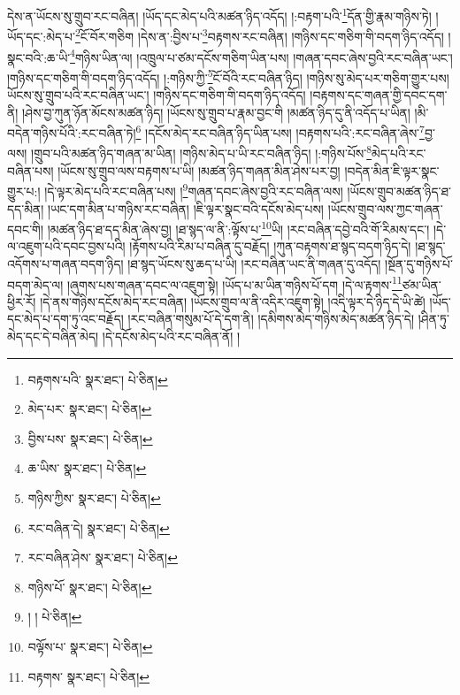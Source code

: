 དེས་ན་ཡོངས་སུ་གྲུབ་རང་བཞིན། །ཡོད་དང་མེད་པའི་མཚན་ཉིད་འདོད། །:བརྟག་པའི་\footnote{བརྟགས་པའི་  སྣར་ཐང་།  པེ་ཅིན། }དོན་གྱི་རྣམ་གཉིས་ཏེ། །ཡོད་དང་:མེད་པ་\footnote{མེད་པར་  སྣར་ཐང་།  པེ་ཅིན། }ངོ་བོར་གཅིག །དེས་ན་:བྱིས་པ་\footnote{བྱིས་པས་  སྣར་ཐང་།  པེ་ཅིན། }བརྟགས་རང་བཞིན། །གཉིས་དང་གཅིག་གི་བདག་ཉིད་འདོད། །སྣང་བའི་:ཆ་ཡི་\footnote{ཆ་ཡིས་  སྣར་ཐང་།  པེ་ཅིན། }གཉིས་ཡིན་ལ། །འཁྲུལ་པ་ཙམ་དངོས་གཅིག་ཡིན་པས། །གཞན་དབང་ཞེས་བྱའི་རང་བཞིན་ཡང་། །གཉིས་དང་གཅིག་གི་བདག་ཉིད་འདོད། །:གཉིས་ཀྱི་\footnote{གཉིས་ཀྱིས་  སྣར་ཐང་།  པེ་ཅིན། }ངོ་བོའི་རང་བཞིན་ཉིད། །གཉིས་སུ་མེད་པར་གཅིག་གྱུར་པས། ཡོངས་སུ་གྲུབ་པའི་རང་བཞིན་ཡང་། །གཉིས་དང་གཅིག་གི་བདག་ཉིད་འདོད། །བརྟགས་དང་གཞན་གྱི་དབང་དག་ནི། །ཤེས་བྱ་ཀུན་ཉོན་མོངས་མཚན་ཉིད། །ཡོངས་སུ་གྲུབ་པ་རྣམ་བྱང་གི །མཚན་ཉིད་དུ་ནི་འདོད་པ་ཡིན། །མི་བདེན་གཉིས་པོའི་:རང་བཞིན་ཏེ།\footnote{རང་བཞིན་དེ།  སྣར་ཐང་།  པེ་ཅིན། } །དངོས་མེད་རང་བཞིན་ཉིད་ཡིན་པས། །བརྟགས་པའི་:རང་བཞིན་ཞེས་\footnote{རང་བཞིན་ཤེས་  སྣར་ཐང་།  པེ་ཅིན། }བྱ་ལས། །གྲུབ་པའི་མཚན་ཉིད་གཞན་མ་ཡིན། །གཉིས་མེད་པ་ཡི་རང་བཞིན་ཉིད། །:གཉིས་པོས་\footnote{གཉིས་པོ་  སྣར་ཐང་།  པེ་ཅིན། }མེད་པའི་རང་བཞིན་པས། །ཡོངས་སུ་གྲུབ་ལས་བརྟགས་པ་ཡི། །མཚན་ཉིད་གཞན་མིན་ཤེས་པར་བྱ། །བདེན་མིན་ཇི་ལྟར་སྣང་གྱུར་པ:། །དེ་ལྟར་མེད་པའི་རང་བཞིན་པས། །\footnote{། །  པེ་ཅིན། }གཞན་དབང་ཞེས་བྱའི་རང་བཞིན་ལས། །ཡོངས་གྲུབ་མཚན་ཉིད་ཐ་དད་མིན། །ཡང་དག་མིན་པ་གཉིས་རང་བཞིན། །ཇི་ལྟར་སྣང་བའི་དངོས་མེད་པས། །ཡོངས་གྲུབ་ལས་ཀྱང་གཞན་དབང་གི། །མཚན་ཉིད་ཐ་དད་མིན་ཞེས་བྱ། །ཐ་སྙད་ལ་ནི་:ལྟོས་པ་\footnote{བལྟོས་པ་  སྣར་ཐང་།  པེ་ཅིན། }ཡི། །རང་བཞིན་དབྱེ་བའི་གོ་རིམས་དང་། །དེ་ལ་འཇུག་པའི་དབང་བྱས་པའི། །རྟོགས་པའི་རིམ་པ་བཞིན་དུ་བརྗོད། །ཀུན་བརྟགས་ཐ་སྙད་བདག་ཉིད་དེ། །ཐ་སྙད་འདོགས་པ་གཞན་བདག་ཉིད། །ཐ་སྙད་ཡོངས་སུ་ཆད་པ་ཡི། །རང་བཞིན་ཡང་ནི་གཞན་དུ་འདོད། །སྔོན་དུ་གཉིས་པོ་བདག་མེད་ལ། །ཞུགས་པས་གཞན་དབང་ལ་འཇུག་སྟེ། །ཡོད་པ་མ་ཡིན་གཉིས་པོ་དག །དེ་ལ་རྟགས་\footnote{བརྟགས་  སྣར་ཐང་།  པེ་ཅིན། }ཙམ་ཡིན་ཕྱིར་རོ། །དེ་ནས་གཉིས་དངོས་མེད་རང་བཞིན། །ཡོངས་གྲུབ་ལ་ནི་འདིར་འཇུག་སྟེ། །འདི་ལྟར་དེ་ཉིད་དེ་ཡི་ཚེ། །ཡོད་དང་མེད་པ་དག་ཏུ་འང་བརྗོད། །རང་བཞིན་གསུམ་པོ་དེ་དག་ནི། །དམིགས་མེད་གཉིས་མེད་མཚན་ཉིད་དེ། །ཤིན་ཏུ་མེད་དང་དེ་བཞིན་མེད། །དེ་དངོས་མེད་པའི་རང་བཞིན་ནོ། །
